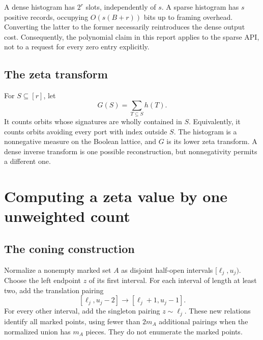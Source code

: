 \documentclass[11pt,letterpaper]{article}
\theoremstyle{definition}
\newcommand{\full}{[r]}
\begin{document}
A dense histogram has $2^r$ slots, independently of $s$. A sparse histogram
has $s$ positive records, occupying $O(s(B+r))$ bits up to framing overhead.
Converting the latter to the former necessarily reintroduces the dense
output cost. Consequently, the polynomial claim in this report applies to
the sparse API, not to a request for every zero entry explicitly.

\subsection{The zeta transform}
For $S\subseteq\full$, let
\begin{equation}\label{eq:zeta}
 G(S)=\sum_{T\subseteq S}h(T).
\end{equation}
It counts orbits whose signatures are wholly contained in $S$. Equivalently,
it counts orbits avoiding every port with index outside $S$. The histogram
is a nonnegative measure on the Boolean lattice, and $G$ is its lower zeta
transform. A dense inverse transform is one possible reconstruction, but
nonnegativity permits a different one.

\section{Computing a zeta value by one unweighted count}\label{sec:cone}

\subsection{The coning construction}
Normalize a nonempty marked set $A$ as disjoint half-open intervals
$[\ell_j,u_j)$. Choose the left endpoint $z$ of its first interval. For each
interval of length at least two, add the translation pairing
\[
 [\ell_j,u_j-2]\longrightarrow[\ell_j+1,u_j-1].
\]
For every other interval, add the singleton pairing $z\sim\ell_j$.
These new relations identify all marked points, using fewer than $2m_A$
additional pairings when the normalized union has $m_A$ pieces. They do not
enumerate the marked points.
\end{document}
